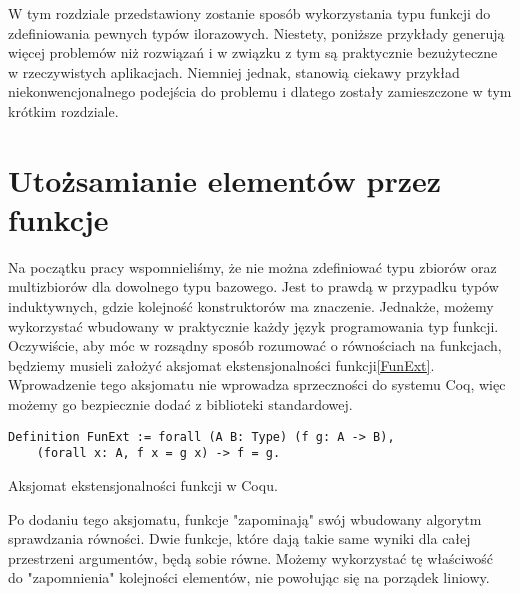 W tym rozdziale przedstawiony zostanie sposób wykorzystania typu funkcji do zdefiniowania pewnych typów ilorazowych. Niestety, poniższe przykłady generują więcej problemów niż rozwiązań i w związku z tym są praktycznie bezużyteczne w rzeczywistych aplikacjach. Niemniej jednak, stanowią ciekawy przykład niekonwencjonalnego podejścia do problemu i dlatego zostały zamieszczone w tym krótkim rozdziale.
\section{Utożsamianie elementów przez funkcje}
Na początku pracy wspomnieliśmy, że nie można zdefiniować typu zbiorów oraz multizbiorów dla dowolnego typu bazowego. Jest to prawdą w przypadku typów induktywnych, gdzie kolejność konstruktorów ma znaczenie. Jednakże, możemy wykorzystać wbudowany w praktycznie każdy język programowania typ funkcji. Oczywiście, aby móc w rozsądny sposób rozumować o równościach na funkcjach, będziemy musieli założyć aksjomat ekstensjonalności funkcji\ref{FunExt}. Wprowadzenie tego aksjomatu nie wprowadza sprzeczności do systemu Coq, więc możemy go bezpiecznie dodać z biblioteki standardowej.
\begin{code}
\begin{verbatim}
Definition FunExt := forall (A B: Type) (f g: A -> B),
    (forall x: A, f x = g x) -> f = g.
\end{verbatim}
\caption{Aksjomat ekstensjonalności funkcji w Coqu.}
\label{FunExt}
\end{code}
Po dodaniu tego aksjomatu, funkcje "zapominają" swój wbudowany algorytm sprawdzania równości. Dwie funkcje, które dają takie same wyniki dla całej przestrzeni argumentów, będą sobie równe. Możemy wykorzystać tę właściwość do "zapomnienia" kolejności elementów, nie powołując się na porządek liniowy.
